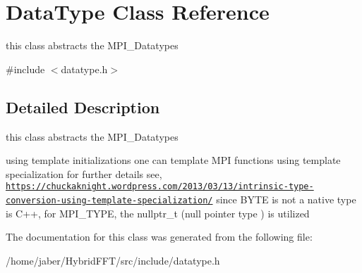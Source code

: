 \hypertarget{classDataType}{}\section{Data\+Type Class Reference}
\label{classDataType}


this class abstracts the M\+P\+I\+\_\+\+Datatypes  




{\ttfamily \#include $<$datatype.\+h$>$}



\subsection{Detailed Description}
this class abstracts the M\+P\+I\+\_\+\+Datatypes 

using template initializations one can template M\+PI functions using template specialization for further details see, \href{https://chuckaknight.wordpress.com/2013/03/13/intrinsic-type-conversion-using-template-specialization/}{\tt https\+://chuckaknight.\+wordpress.\+com/2013/03/13/intrinsic-\/type-\/conversion-\/using-\/template-\/specialization/} since B\+Y\+TE is not a native type is C++, for M\+P\+I\+\_\+\+T\+Y\+PE, the nullptr\+\_\+t (null pointer type ) is utilized 

The documentation for this class was generated from the following file\+:\begin{DoxyCompactItemize}
\item 
/home/jaber/\+Hybrid\+F\+F\+T/src/include/datatype.\+h\end{DoxyCompactItemize}

